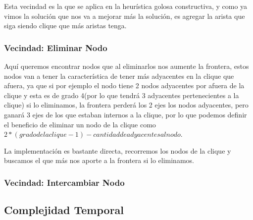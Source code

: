 Esta vecindad es la que se aplica en la heurística golosa constructiva, y como ya vimos la solución que nos va a mejorar más la solución, es agregar la arista que siga siendo clique que más aristas tenga.

\subsubsection{Vecindad: Eliminar Nodo}

Aquí queremos encontrar nodos que al eliminarlos nos aumente la frontera, estos nodos van a tener la característica de tener más adyacentes en la clique que afuera, ya que si por ejemplo el nodo tiene 2 nodos adyacentes por afuera de la clique y esta es de grado 4(por lo que tendrá 3 adyacentes pertenecientes a la clique) si lo eliminamos, la frontera perderá los 2 ejes los nodos adyacentes, pero ganará 3 ejes de los que estaban internos a la clique, por lo que podemos definir el beneficio de eliminar un nodo de la clique como $2 * (grado de la clique - 1) - cantidad de adyacentes al nodo$.

La implementación es bastante directa, recorremos los nodos de la clique y buscamos el que más nos aporte a la frontera si lo eliminamos.

\subsubsection{Vecindad: Intercambiar Nodo}

\subsection{Complejidad Temporal}

